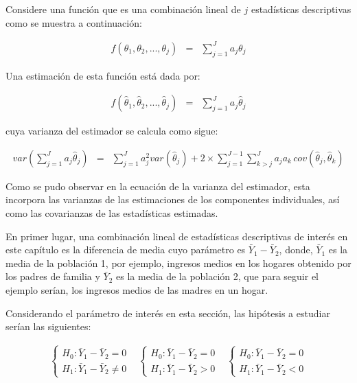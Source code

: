 \documentclass[
  12pt,
]{book}
\begin{document}
Considere una función que es una combinación lineal de \(j\) estadísticas descriptivas como se muestra a continuación:

\begin{eqnarray*}
f\left(\theta_{1},\theta_{2},...,\theta_{j}\right) & = & \sum_{j=1}^{J}a_{j}\theta_{j}
\end{eqnarray*}

Una estimación de esta función está dada por:

\begin{eqnarray*}
f\left(\hat{\theta}_{1},\hat{\theta}_{2},...,\hat{\theta}_{j}\right) & = & \sum_{j=1}^{J}a_{j}\hat{\theta}_{j}
\end{eqnarray*}

cuya varianza del estimador se calcula como sigue:

\begin{eqnarray*}
var\left(\sum_{j=1}^{J}a_{j}\hat{\theta}_{j}\right) & = & \sum_{j=1}^{J}a_{j}^{2}var\left(\hat{\theta}_{j}\right)+2\times\sum_{j=1}^{J-1}\sum_{k>j}^{J}a_{j}a_{k}\,cov\left(\hat{\theta}_{j},\hat{\theta}_{k}\right)
\end{eqnarray*}

Como se pudo observar en la ecuación de la varianza del estimador, esta incorpora las varianzas de las estimaciones de los componentes individuales, así como las covarianzas de las estadísticas estimadas.

En primer lugar, una combinación lineal de estadísticas descriptivas de interés en este capítulo es la diferencia de media cuyo parámetro es \({\bar{Y}_{1}-\bar{Y}_{2}}\), donde, \(\bar{Y}_{1}\) es la media de la población 1, por ejemplo, ingresos medios en los hogares obtenido por los padres de familia y \(\bar{Y}_{2}\) es la media de la población 2, que para seguir el ejemplo serían, los ingresos medios de las madres en un hogar.

Considerando el parámetro de interés en esta sección, las hipótesis a estudiar serían las siguientes:

\begin{eqnarray*}
\begin{cases}
H_{0}:\bar{Y}_{1}-\bar{Y}_{2}=0\\
H_{1}:\bar{Y}_{1}-\bar{Y}_{2}\neq0
\end{cases} & \begin{cases}
H_{0}:\bar{Y}_{1}-\bar{Y}_{2}=0\\
H_{1}:\bar{Y}_{1}-\bar{Y}_{2}>0
\end{cases} & \begin{cases}
H_{0}:\bar{Y}_{1}-\bar{Y}_{2}=0\\
H_{1}:\bar{Y}_{1}-\bar{Y}_{2}<0
\end{cases}
\end{eqnarray*}
\end{document}

